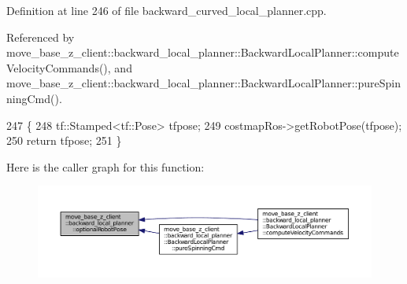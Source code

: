 Definition at line 246 of file backward\+\_\+curved\+\_\+local\+\_\+planner.\+cpp.



Referenced by move\+\_\+base\+\_\+z\+\_\+client\+::backward\+\_\+local\+\_\+planner\+::\+Backward\+Local\+Planner\+::compute\+Velocity\+Commands(), and move\+\_\+base\+\_\+z\+\_\+client\+::backward\+\_\+local\+\_\+planner\+::\+Backward\+Local\+Planner\+::pure\+Spinning\+Cmd().


\begin{DoxyCode}
247 \{
248     tf::Stamped<tf::Pose> tfpose;
249     costmapRos->getRobotPose(tfpose);
250     \textcolor{keywordflow}{return} tfpose;
251 \}
\end{DoxyCode}


Here is the caller graph for this function\+:
\nopagebreak
\begin{figure}[H]
\begin{center}
\leavevmode
\includegraphics[width=350pt]{namespacemove__base__z__client_1_1backward__local__planner_a80dbd10807e5f70adfcd0ff4dcb7c1db_icgraph}
\end{center}
\end{figure}


